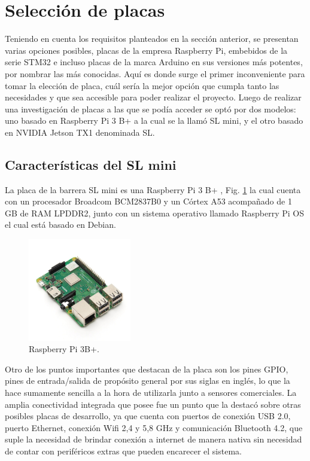 \section{Selección de placas}

Teniendo en cuenta los requisitos planteados en la sección anterior, se presentan varias opciones posibles,
placas de la empresa Raspberry Pi, embebidos de la serie STM32 e incluso placas de la marca Arduino en sus versiones más potentes, por nombrar las más conocidas.
Aquí es donde surge el primer inconveniente para tomar la elección de placa,
cuál sería la mejor opción que cumpla tanto las necesidades y que sea accesible para poder realizar el proyecto.
Luego de realizar una investigación de placas a las que se podía acceder se optó por dos modelos: uno basado en Raspberry Pi 3 B+ a la cual se la llamó SL mini, y el otro basado en NVIDIA Jetson TX1 denominada SL.

\subsection{Características del SL mini}

La placa de la barrera SL mini es una Raspberry Pi 3 B+ \cite{noauthor_documentacion_nodate-2}, Fig. \ref{fig:raspberry} la cual cuenta con un procesador
Broadcom BCM2837B0 y un Córtex A53 acompañado de 1 GB de RAM LPDDR2, junto con un sistema operativo llamado Raspberry Pi OS el cual está basado en Debian.

\begin{figure}
    \centering
    \includegraphics[width=0.4\textwidth]{imgs/Raspberry-pi3b+.jpg}
    \caption{Raspberry Pi 3B+.}
    \label{fig:raspberry}
\end{figure}

Otro de los puntos importantes que destacan de la placa son los pines GPIO, pines de entrada/salida de propósito general por sus siglas en inglés, lo que la hace sumamente sencilla a la hora de utilizarla junto a sensores comerciales.
La amplia conectividad integrada que posee fue un punto que la destacó sobre otras posibles placas de desarrollo, ya que cuenta con puertos de conexión USB 2.0, puerto Ethernet, conexión Wifi 2,4 y 5,8 GHz y comunicación Bluetooth 4.2, que suple la necesidad de brindar conexión a internet de manera nativa sin necesidad de contar con periféricos extras que pueden encarecer el sistema.


